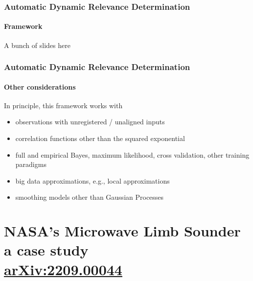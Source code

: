 \documentclass{snedecorbeamer}
\begin{document}
\begin{frame}
  \frametitle{Automatic Dynamic Relevance Determination}
  \framesubtitle{Framework}

  A bunch of slides here
\end{frame}

\begin{frame}
  \frametitle{Automatic Dynamic Relevance Determination}
  \framesubtitle{Other considerations}

  In principle, this framework works with
  \begin{itemize}
  \item observations with unregistered / unaligned inputs
  \item correlation functions other than the squared exponential
  \item full and empirical Bayes, maximum likelihood, cross validation,
    other training paradigms
  \item big data approximations, e.g., local approximations
  \item smoothing models other than Gaussian Processes
  \end{itemize}
\end{frame}


\section{NASA's Microwave Limb Sounder \\ {\small a case study} \\
  {\tiny
    \href{https://doi.org/10.48550/arXiv.2209.00044}{arXiv:2209.00044}}}
\end{document}
